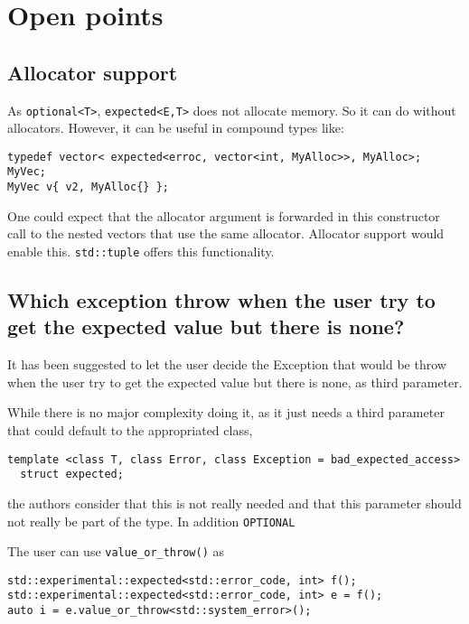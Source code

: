 \documentclass[a4paper,10pt]{article}
\newcommand{\cpp}[1]{\lstinline{#1}}
\begin{document}
\section{Open points}

\subsection{Allocator support}

As \cpp{optional<T>},  \cpp{expected<E,T>} does not allocate memory. So it can do without allocators. However, it can be useful in compound types like:

\begin{lstlisting}
typedef vector< expected<erroc, vector<int, MyAlloc>>, MyAlloc>; MyVec;
MyVec v{ v2, MyAlloc{} };
\end{lstlisting}

One could expect that the allocator argument is forwarded in this constructor call to the nested vectors that use the same allocator. Allocator support would enable this. \cpp{std::tuple} offers this functionality.

\subsection{Which exception throw when the user try to get the expected value but there is none?}

It has been suggested to let the user decide the Exception that would be throw when the user try to get the expected value but there is none, as third parameter. 

While there is no major complexity doing it, as it just needs a third parameter that could default to the appropriated class, 

\begin{lstlisting}
template <class T, class Error, class Exception = bad_expected_access>
  struct expected;
\end{lstlisting}

the authors consider that this is not really needed and that this parameter should not really be part of the type. In addition \cpp{OPTIONAL}

The user can use \cpp{value_or_throw()} as

\begin{lstlisting}
std::experimental::expected<std::error_code, int> f();
std::experimental::expected<std::error_code, int> e = f();
auto i = e.value_or_throw<std::system_error>();  
\end{lstlisting}
\end{document}

